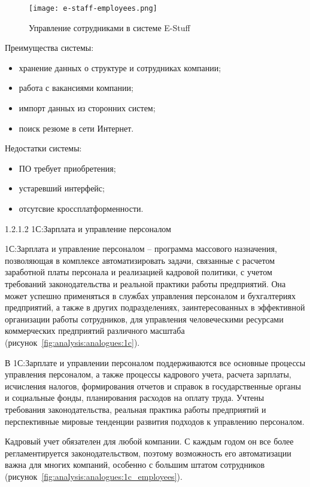 \begin{figure}[!h]
	\centering
	\texttt{[image: e-staff-employees.png]} 
	\caption{Управление сотрудниками в системе E-Stuff}
	\label{fig:analysis:analogues:e-staff-employees}
\end{figure}

Преимущества системы:
\begin{itemize}
	\item хранение данных о структуре и сотрудниках компании;
	\item работа с вакансиями компании;
	\item импорт данных из сторонних систем;
	\item поиск резюме в сети Интернет.
\end{itemize}

Недостатки системы:
\begin{itemize}
	\item ПО требует приобретения;
	\item устаревший интерфейс;
	\item отсутсвие кроссплатформенности.
\end{itemize}

1.2.1.2 1С:Зарплата и управление персоналом

1С:Зарплата и управление персоналом -- программа массового назначения, позволяющая в комплексе автоматизировать
задачи, связанные с расчетом заработной платы персонала и реализацией кадровой политики, с учетом требований
законодательства и реальной практики работы предприятий. Она может успешно применяться в службах управления персоналом
и бухгалтериях предприятий, а также в других подразделениях, заинтересованных в эффективной организации работы
сотрудников, для управления человеческими ресурсами коммерческих предприятий различного масштаба
(рисунок~\ref{fig:analysis:analogues:1c}).

В 1С:Зарплате и управлении персоналом поддерживаются все основные процессы управления персоналом, а также процессы
кадрового учета, расчета зарплаты, исчисления налогов, формирования отчетов и справок в государственные органы и
социальные фонды, планирования расходов на оплату труда. Учтены требования законодательства, реальная практика работы
предприятий и перспективные мировые тенденции развития подходов к управлению персоналом.

Кадровый учет обязателен для любой компании. С каждым годом он все более регламентируется законодательством, поэтому
возможность его автоматизации важна для многих компаний, особенно с большим штатом сотрудников
(рисунок~\ref{fig:analysis:analogues:1c_employees}).

